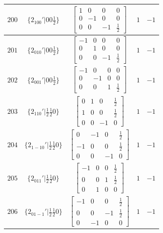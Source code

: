 \documentclass[fleqn,8pt]{jsarticle}
\begin{document}
\begin{longtable}{ccccc}
$ 200 $ & $ \{2{}_{100}{}'|0 0 \frac{1}{2}\} $ & $ \begin{bmatrix} 1 & 0 & 0 & 0 \\ 0 & -1 & 0 & 0 \\ 0 & 0 & -1 & \frac{1}{2} \end{bmatrix} $ & $ 1 $ & $ -1 $ \\ \hline
$ 201 $ & $ \{2{}_{010}{}'|0 0 \frac{1}{2}\} $ & $ \begin{bmatrix} -1 & 0 & 0 & 0 \\ 0 & 1 & 0 & 0 \\ 0 & 0 & -1 & \frac{1}{2} \end{bmatrix} $ & $ 1 $ & $ -1 $ \\ \hline
$ 202 $ & $ \{2{}_{001}{}'|0 0 \frac{1}{2}\} $ & $ \begin{bmatrix} -1 & 0 & 0 & 0 \\ 0 & -1 & 0 & 0 \\ 0 & 0 & 1 & \frac{1}{2} \end{bmatrix} $ & $ 1 $ & $ -1 $ \\ \hline
$ 203 $ & $ \{2{}_{110}{}'|\frac{1}{2} \frac{1}{2} 0\} $ & $ \begin{bmatrix} 0 & 1 & 0 & \frac{1}{2} \\ 1 & 0 & 0 & \frac{1}{2} \\ 0 & 0 & -1 & 0 \end{bmatrix} $ & $ 1 $ & $ -1 $ \\ \hline
$ 204 $ & $ \{2{}_{1-10}{}'|\frac{1}{2} \frac{1}{2} 0\} $ & $ \begin{bmatrix} 0 & -1 & 0 & \frac{1}{2} \\ -1 & 0 & 0 & \frac{1}{2} \\ 0 & 0 & -1 & 0 \end{bmatrix} $ & $ 1 $ & $ -1 $ \\ \hline
$ 205 $ & $ \{2{}_{011}{}'|\frac{1}{2} \frac{1}{2} 0\} $ & $ \begin{bmatrix} -1 & 0 & 0 & \frac{1}{2} \\ 0 & 0 & 1 & \frac{1}{2} \\ 0 & 1 & 0 & 0 \end{bmatrix} $ & $ 1 $ & $ -1 $ \\ \hline
$ 206 $ & $ \{2{}_{01-1}{}'|\frac{1}{2} \frac{1}{2} 0\} $ & $ \begin{bmatrix} -1 & 0 & 0 & \frac{1}{2} \\ 0 & 0 & -1 & \frac{1}{2} \\ 0 & -1 & 0 & 0 \end{bmatrix} $ & $ 1 $ & $ -1 $ \\ \hline

\end{longtable}
\end{document}

